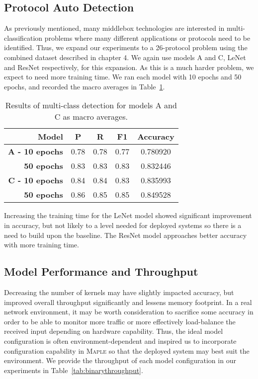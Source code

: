 \subsection{Protocol Auto Detection}

As previously mentioned, many middlebox technologies are interested in multi-classification problems where many different applications or protocols need to be identified. Thus, we expand our experiments to a 26-protocol problem using the combined dataset described in chapter 4. We again use models A and C, LeNet and ResNet respectively, for this expansion. As this is a much harder problem, we expect to need more training time. We ran each model with 10 epochs and 50 epochs, and recorded the macro averages in Table~\ref{tab:multiresults}.

\begin{table} [h!]
\centering
\begin{tabular}{| r | c | c | c | c |}
\hline
Model & P & R & F1 & Accuracy \\
\hline
\textbf{A - 10 epochs} & 0.78 & 0.78 & 0.77 & 0.780920\\
\textbf{50 epochs} & 0.83 & 0.83 & 0.83 & 0.832446 \\
\hline
\textbf{C - 10 epochs} & 0.84 & 0.84 & 0.83 & 0.835993 \\
\textbf{50 epochs} & 0.86 & 0.85 & 0.85 & 0.849528\\
\hline
\end{tabular}
\caption{Results of multi-class detection for models A and C as macro averages.}
\label{tab:multiresults}
\end{table}

Increasing the training time for the LeNet model showed significant improvement in accuracy, but not likely to a level needed for deployed systems so there is a need to build upon the baseline. The ResNet model approaches better accuracy with more training time.

\subsection{Model Performance and Throughput}
Decreasing the number of kernels may have slightly impacted accuracy, but improved overall throughput significantly and lessens memory footprint. In a real network environment, it may be worth consideration to sacrifice some accuracy in order to be able to monitor more traffic or more effectively load-balance the received input depending on hardware capability. Thus, the ideal model configuration is often environment-dependent and inspired us to incorporate configuration capability in \textsc{Maple} so that the deployed system may best suit the environment. We provide the throughput of each model configuration in our experiments in Table~\ref{tab:binarythroughput}.

